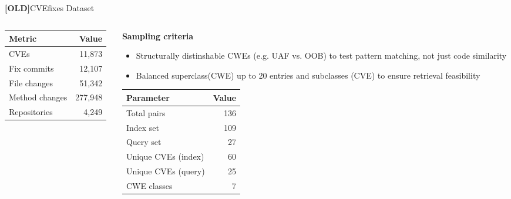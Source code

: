 \documentclass[aspectratio=169,10pt]{beamer}
\begin{document}
\begin{frame}{\textbf{[OLD]}CVEfixes Dataset }
\begin{columns}[T]
\begin{column}{0.48\textwidth}
\begin{center}
  \scriptsize
  \begin{tabular}{lr}
    \toprule
    \textbf{Metric} & \textbf{Value} \\
    \midrule
    CVEs & 11,873 \\
    Fix commits & 12,107 \\
    File changes & 51,342 \\
    Method changes & 277,948 \\
    Repositories & 4,249 \\
    \bottomrule
  \end{tabular}
  \end{center}
\end{column}
\begin{column}{0.50\textwidth}
    {\small\textbf{Sampling criteria}}\\[3pt]
  {\scriptsize
  \begin{itemize}\itemsep1pt
    \item Structurally distinshable CWEs (e.g. UAF vs. OOB) to test pattern matching, not just code similarity
    \item Balanced superclass(CWE) up to 20 entries and subclasses (CVE) to ensure retrieval feasibility
  \end{itemize}}
      \vspace{0.5em}
    \begin{center}
      {\scriptsize
  \renewcommand{\arraystretch}{1.2}
  \begin{tabular}{lr}
    \toprule
    \textbf{Parameter} & \textbf{Value} \\
    \midrule
    Total pairs & 136 \\
    Index set & 109 \\
    Query set & 27 \\
    Unique CVEs (index) & 60 \\
    Unique CVEs (query) & 25 \\
    CWE classes & 7 \\
    \bottomrule
  \end{tabular}}
    \end{center}
  
\end{column}
\end{columns}
\end{frame}
\end{document}
